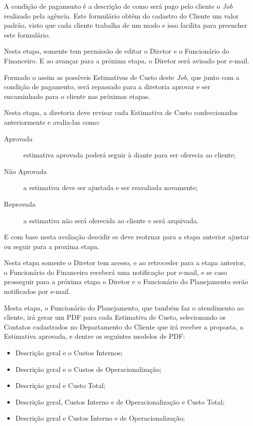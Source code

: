 \documentclass[
  12pt,            %
  openany,
  oneside,
  a4paper,         %
  english,      %
  brazil
]{article}
\numberwithin{figure}{section}
\numberwithin{table}{section}
\newcounter{subsubsubsection}[subsubsection]
\begin{document}
A condição de pagamento é a descrição de como será pago pelo cliente o \textit{Job} realizado pela agência. Este formulário obtêm do cadastro do Cliente um valor padrão, visto que cada cliente trabalha de um modo e isso facilita para preencher este formulário.

Nesta etapa, somente tem permissão de editar o Diretor e o Funcionário do Financeiro. E ao avançar para a próxima etapa, o Diretor será avisado por e-mail.

Formado o assim as possíveis Estimativas de Custo deste \textit{Job}, que junto com a condição de pagamento, será repassado para a diretoria aprovar e ser encaminhado para o cliente nas próximas etapas.



Nesta etapa, a diretoria deve revisar cada Estimativa de Custo confeccionadas anteriormente e avalia-las como:

\begin{description}
  \item[Aprovada] estimativa aprovada poderá seguir à diante para ser oferecia ao cliente;
  \item[Não Aprovada] a estimativa deve ser ajustada e ser reavaliada novamente;
  \item[Reprovada] a estimativa não será oferecida ao cliente e será arquivada.
\end{description}

E com base nesta avaliação descidir se deve reotrnar para a etapa anterior ajustar ou seguir para a proxima etapa.

Nesta etapa somente o Diretor tem acesso, e ao retroceder para a etapa anterior, o Funcionário do Financeiro receberá uma notificação por e-mail, e se caso prosseguir para a próxima etapa o Diretor e o Funcionário do Planejamento serão notificados por e-mail.



Mesta etapa, o Funcionário do Planejamento, que também faz o atendimento ao cliente, irá gerar um PDF para cada Estimativa de Custo, selecionando os Contatos cadastrados no Departamento do Cliente que irá receber a proposta, a Estimativa aprovada, e dentre os seguintes modelos de PDF:

\begin{itemize}
  \item Descrição geral e o Custos Internos;
  \item Descrição geral e o Custos de Operacionalização;
  \item Descrição geral e Custo Total;
  \item Descrição geral, Custos Interno e de Operacionalização e Custo Total;
  \item Descrição geral e Custos Interno e de Operacionalização;
\end{itemize}
\end{document}
